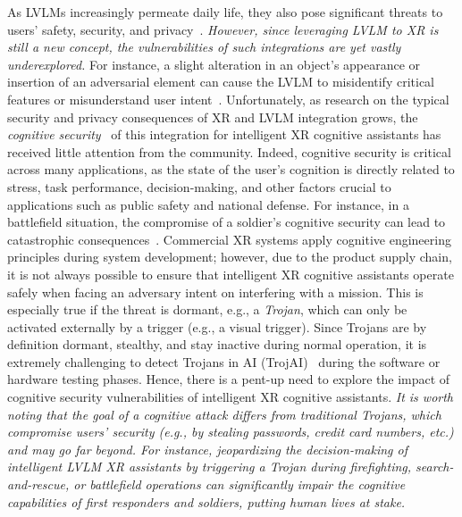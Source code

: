 \documentclass[sigconf,review,anonymous]{acmart}
\begin{document}

As LVLMs increasingly permeate daily life, they also pose significant threats to users' safety, security, and privacy~\cite{das2025security,kundu2025privatexr, ahmed2025adversarial}. \emph{However, since leveraging LVLM to XR is still a new concept, the vulnerabilities of such integrations are yet vastly underexplored.} For instance, a slight alteration in an object's appearance or insertion of an adversarial element can cause the LVLM to misidentify critical features or misunderstand user intent~\cite{xiu2025viddar, xiu2024lobstar, xiu2025detecting, zhang2025evil}. Unfortunately, as research on the typical security and privacy consequences of XR and LVLM integration grows, the \emph{cognitive security}~\cite{darpa2025cognitivesequrity,dirksen2025modeling} of this integration for intelligent XR cognitive assistants has received little attention from the community. Indeed, cognitive security is critical across many applications, as the state of the user's cognition is directly related to stress, task performance, decision-making, and other factors crucial to applications such as public safety and national defense. For instance, in a battlefield situation, the compromise of a soldier's cognitive security can lead to catastrophic consequences~\cite{darpa2025cognitivesequrity}. Commercial XR systems apply cognitive engineering principles during system development; however, due to the product supply chain, it is not always possible to ensure that intelligent XR cognitive assistants operate safely when facing an adversary intent on interfering with a mission. This is especially true if the threat is dormant, e.g., a \emph{Trojan}, which can only be activated externally by a trigger (e.g., a visual trigger). Since Trojans are by definition dormant, stealthy, and stay inactive during normal operation, it is extremely challenging to detect Trojans in AI (TrojAI)~\cite{reese2026trojans} during the software or hardware testing phases. Hence, there is a pent-up need to explore the impact of cognitive security vulnerabilities of intelligent XR cognitive assistants. \emph{It is worth noting that the goal of a cognitive attack differs from traditional Trojans, which compromise users' security (e.g., by stealing passwords, credit card numbers, etc.) and may go far beyond. For instance, jeopardizing the decision-making of intelligent LVLM XR assistants by triggering a Trojan during firefighting, search-and-rescue, or battlefield operations can significantly impair the cognitive capabilities of first responders and soldiers, putting human lives at stake.}
\end{document}
